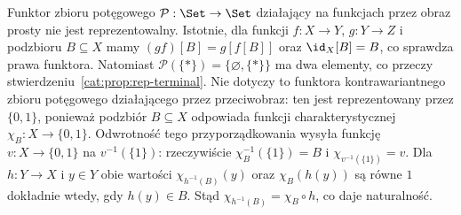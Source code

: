 \begin{przyklad}\label{cat:ex:nonrepresentable}
Funktor zbioru potęgowego $\mathcal P:\Set\to\Set$ działający na funkcjach przez obraz prosty nie jest reprezentowalny. Istotnie, dla funkcji $f:X\to Y$, $g:Y\to Z$ i podzbioru $B\subseteq X$ mamy $(gf)[B]=g[f[B]]$ oraz $\id_X[B]=B$, co sprawdza prawa funktora. Natomiast $\mathcal P(\{*\})=\{\varnothing,\{*\}\}$ ma dwa elementy, co przeczy stwierdzeniu~\ref{cat:prop:rep-terminal}. Nie dotyczy to funktora kontrawariantnego zbioru potęgowego działającego przez przeciwobraz: ten jest reprezentowany przez $\{0,1\}$, ponieważ podzbiór $B\subseteq X$ odpowiada funkcji charakterystycznej $\chi_B:X\to\{0,1\}$. Odwrotność tego przyporządkowania wysyła funkcję $v:X\to\{0,1\}$ na $v^{-1}(\{1\})$: rzeczywiście $\chi_B^{-1}(\{1\})=B$ i $\chi_{v^{-1}(\{1\})}=v$. Dla $h:Y\to X$ i $y\in Y$ obie wartości $\chi_{h^{-1}(B)}(y)$ oraz $\chi_B(h(y))$ są równe $1$ dokładnie wtedy, gdy $h(y)\in B$. Stąd $\chi_{h^{-1}(B)}=\chi_B\circ h$, co daje naturalność.
\end{przyklad}
